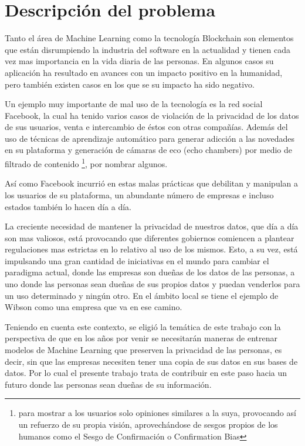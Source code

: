 \documentclass[
11pt, %
oneside, %
spanish, %
singlespacing, %
parskip, %
headsepline, %
chapterinoneline, %
]{MastersDoctoralThesis} %
\begin{document}
\chapter{Descripci\'on del problema}

Tanto el área de Machine Learning como la tecnología Blockchain son elementos que están disrumpiendo la industria del software en la actualidad y tienen cada vez mas importancia en la vida diaria de las personas. En algunos casos su aplicación ha resultado en avances con un impacto positivo en la humanidad, pero también existen casos en los que se su impacto ha sido negativo.

Un ejemplo muy importante de mal uso de la tecnología es la red social Facebook, la cual ha tenido varios casos de violación de la privacidad de los datos de sus usuarios, venta e intercambio de éstos con otras compañías. Además del uso de técnicas de aprendizaje automático para generar adicción a las novedades en su plataforma y generación de cámaras de eco (echo chambers) por medio de filtrado de contenido \footnote{para mostrar a los usuarios solo opiniones similares a la suya, provocando así un refuerzo de su propia visión, aprovechándose de sesgos propios de los humanos como el Sesgo de Confirmación o Confirmation Bias}, por nombrar algunos.

Así como Facebook incurrió en estas malas prácticas que debilitan y manipulan a los usuarios de su plataforma, un abundante número de empresas e incluso estados también lo hacen día a día.

La creciente necesidad de mantener la privacidad de nuestros datos, que día a día son mas valiosos, está provocando que diferentes gobiernos comiencen a plantear regulaciones mas estrictas en lo relativo al uso de los mismos.
Esto, a su vez, está impulsando una gran cantidad de iniciativas en el mundo para cambiar el paradigma actual, donde las empresas son dueñas de los datos de las personas, a uno donde las personas sean dueñas de sus propios datos y puedan venderlos para un uso determinado y ningún otro. En el ámbito local se tiene el ejemplo de Wibson como una empresa que va en ese camino. 

Teniendo en cuenta este contexto, se eligió la temática de este trabajo con la perspectiva de que en los años por venir se necesitarán maneras de entrenar modelos de Machine Learning que preserven la privacidad de las personas, es decir, sin que las empresas necesiten tener una copia de sus datos en sus bases de datos. Por lo cual el presente trabajo trata de contribuir en este paso hacia un futuro donde las personas sean dueñas de su información. 
\end{document}
